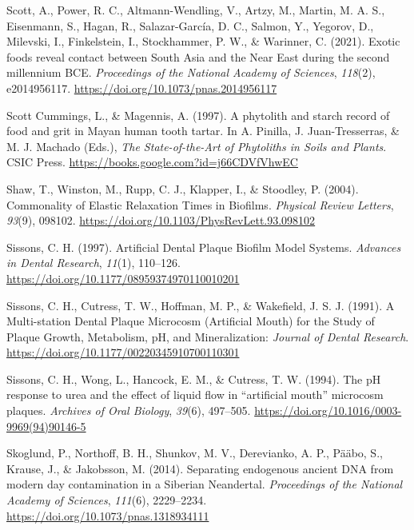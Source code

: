 \documentclass[
  letterpaper,
]{book}
\newlength{\cslhangindent}
\newlength{\cslentryspacingunit} %
\newenvironment{CSLReferences}[2] %
 {%
  \setlength{\parindent}{0pt}
  \ifodd #1
  \let\oldpar\par
  \def\par{\hangindent=\cslhangindent\oldpar}
  \fi
  \setlength{\parskip}{#2\cslentryspacingunit}
 }%
 {}
\begin{document}
\begin{CSLReferences}{1}{0}
\leavevmode{}%
Scott, A., Power, R. C., Altmann-Wendling, V., Artzy, M., Martin, M. A.
S., Eisenmann, S., Hagan, R., Salazar-García, D. C., Salmon, Y.,
Yegorov, D., Milevski, I., Finkelstein, I., Stockhammer, P. W., \&
Warinner, C. (2021). Exotic foods reveal contact between {South Asia}
and the {Near East} during the second millennium {BCE}.
\emph{Proceedings of the National Academy of Sciences}, \emph{118}(2),
e2014956117. \url{https://doi.org/10.1073/pnas.2014956117}

\leavevmode{}%
Scott Cummings, L., \& Magennis, A. (1997). A phytolith and starch
record of food and grit in {Mayan} human tooth tartar. In A. Pinilla, J.
Juan-Tresserras, \& M. J. Machado (Eds.), \emph{The {State-of-the-Art}
of {Phytoliths} in {Soils} and {Plants}}. {CSIC Press}.
\url{https://books.google.com?id=j66CDVfVhwEC}

\leavevmode{}%
Shaw, T., Winston, M., Rupp, C. J., Klapper, I., \& Stoodley, P. (2004).
Commonality of {Elastic Relaxation Times} in {Biofilms}. \emph{Physical
Review Letters}, \emph{93}(9), 098102.
\url{https://doi.org/10.1103/PhysRevLett.93.098102}

\leavevmode{}%
Sissons, C. H. (1997). Artificial {Dental Plaque Biofilm Model Systems}.
\emph{Advances in Dental Research}, \emph{11}(1), 110--126.
\url{https://doi.org/10.1177/08959374970110010201}

\leavevmode{}%
Sissons, C. H., Cutress, T. W., Hoffman, M. P., \& Wakefield, J. S. J.
(1991). A {Multi-station Dental Plaque Microcosm} ({Artificial Mouth})
for the {Study} of {Plaque Growth}, {Metabolism}, {pH}, and
{Mineralization}: \emph{Journal of Dental Research}.
\url{https://doi.org/10.1177/00220345910700110301}

\leavevmode{}%
Sissons, C. H., Wong, L., Hancock, E. M., \& Cutress, T. W. (1994). The
{pH} response to urea and the effect of liquid flow in {``artificial
mouth''} microcosm plaques. \emph{Archives of Oral Biology},
\emph{39}(6), 497--505.
\url{https://doi.org/10.1016/0003-9969(94)90146-5}

\leavevmode{}%
Skoglund, P., Northoff, B. H., Shunkov, M. V., Derevianko, A. P., Pääbo,
S., Krause, J., \& Jakobsson, M. (2014). Separating endogenous ancient
{DNA} from modern day contamination in a {Siberian Neandertal}.
\emph{Proceedings of the National Academy of Sciences}, \emph{111}(6),
2229--2234. \url{https://doi.org/10.1073/pnas.1318934111}


\end{CSLReferences}
\end{document}
